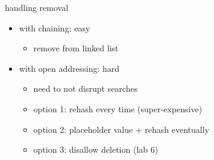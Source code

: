 \begin{frame}{handling removal}
\begin{itemize}
\item with chaining: easy
    \begin{itemize}
    \item remove from linked list
    \end{itemize}
\item with open addressing: hard
    \begin{itemize}
    \item need to not disrupt searches
    \item option 1: rehash every time (super-expensive)
    \item option 2: placeholder value + rehash eventually
    \item option 3: disallow deletion (lab 6)
    \end{itemize}
\end{itemize}
\end{frame}
